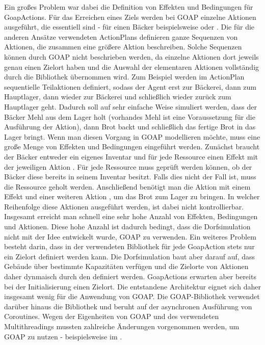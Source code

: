Ein großes Problem war dabei die Definition von Effekten und Bedingungen für GoapActions. Für das Erreichen eines Ziels werden bei GOAP einzelne Aktionen ausgeführt, die essentiell sind - für einen Bäcker beispielsweise  oder . Die für die anderen Ansätze verwendeten ActionPlans definieren ganze Sequenzen von Aktionen, die zusammen eine größere Aktion beschreiben. Solche Sequenzen können durch GOAP nicht beschrieben werden, da einzelne Aktionen dort jeweils genau einen Zielort haben und die Auswahl der elementaren Aktionen vollständig durch die Bibliothek übernommen wird. Zum Beispiel werden im ActionPlan  sequentielle Teilaktionen definiert, sodass der Agent erst zur Bäckerei, dann zum Hauptlager, dann wieder zur Bäckerei und schließlich wieder zurück zum Hauptlager geht. Dadurch soll auf sehr einfache Weise simuliert werden, dass der Bäcker Mehl aus dem Lager holt (vorhandes Mehl ist eine Voraussetzung für die Ausführung der Aktion), dann Brot backt und schließlich das fertige Brot in das Lager bringt. Wenn man diesen Vorgang in GOAP modellieren möchte, muss eine große Menge von Effekten und Bedingungen eingeführt werden. Zunächst braucht der Bäcker entweder ein eigenes Inventar und für jede Ressource einen Effekt  mit der jeweiligen Aktion . Für jede Ressource muss geprüft werden können, ob der Bäcker diese bereits in seinem Inventar besitzt. Falls dies nicht der Fall ist, muss die Ressource geholt werden. Anschließend benötigt man die Aktion  mit einem Effekt  und einer weiteren Aktion , um das Brot zum Lager zu bringen. 
In welcher Reihenfolge diese Aktionen ausgeführt werden, ist dabei nicht kontrollierbar. Insgesamt erreicht man schnell eine sehr hohe Anzahl von Effekten, Bedingungen und Aktionen. Diese hohe Anzahl ist dadurch bedingt, dass die Dorfsimulation nicht mit der Idee entwickelt wurde, GOAP zu verwenden. Ein weiteres Problem besteht darin, dass in der verwendeten Bibliothek für jede GoapAction stets nur ein Zielort definiert werden kann. Die Dorfsimulation baut aber darauf auf, dass Gebäude über bestimmte Kapazitäten verfügen und die Zielorte von Aktionen daher dynmaisch durch den  definiert werden. GoapActions erwarten aber bereits bei der Initialisierung einen Zielort. Die entstandene Architektur eignet sich daher insgesamt wenig für die Anwendung von GOAP. Die GOAP-Bibliothek verwendet darüber hinaus die Bibliothek \cite{ninja} und beruht auf der asynchronen Ausführung von Coroutines. Wegen der Eigenheiten von GOAP und des verwendeten Multithreadings mussten zahlreiche Änderungen vorgenommen werden, um GOAP zu nutzen - beispielsweise im .

